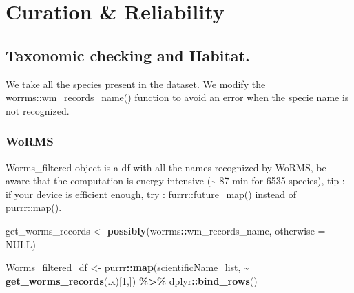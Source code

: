 \documentclass[
]{article}
\newenvironment{Shaded}{\begin{snugshade}}{\end{snugshade}}
\newcommand{\AttributeTok}[1]{\textcolor[rgb]{0.13,0.29,0.53}{#1}}
\newcommand{\ConstantTok}[1]{\textcolor[rgb]{0.56,0.35,0.01}{#1}}
\newcommand{\DecValTok}[1]{\textcolor[rgb]{0.00,0.00,0.81}{#1}}
\newcommand{\FunctionTok}[1]{\textcolor[rgb]{0.13,0.29,0.53}{\textbf{#1}}}
\newcommand{\NormalTok}[1]{#1}
\newcommand{\OtherTok}[1]{\textcolor[rgb]{0.56,0.35,0.01}{#1}}
\newcommand{\SpecialCharTok}[1]{\textcolor[rgb]{0.81,0.36,0.00}{\textbf{#1}}}
\begin{document}
\hypertarget{curation-reliability}{%
\section{Curation \& Reliability}\label{curation-reliability}}

\hypertarget{taxonomic-checking-and-habitat.}{%
\subsection{Taxonomic checking and
Habitat.}\label{taxonomic-checking-and-habitat.}}

We take all the species present in the dataset. We modify the
worrms::wm\_records\_name() function to avoid an error when the specie
name is not recognized.

\begin{Shaded}
\end{Shaded}

\hypertarget{worms}{%
\subsubsection{WoRMS}\label{worms}}

Worms\_filtered object is a df with all the names recognized by WoRMS,
be aware that the computation is energy-intensive (\textasciitilde{} 87
min for 6535 species), tip : if your device is efficient enough, try :
furrr::future\_map() instead of purrr::map().

\begin{Shaded}
\begin{Highlighting}[]
\NormalTok{get\_worms\_records }\OtherTok{\textless{}{-}} \FunctionTok{possibly}\NormalTok{(worrms}\SpecialCharTok{::}\NormalTok{wm\_records\_name, }\AttributeTok{otherwise =} \ConstantTok{NULL}\NormalTok{)}

\NormalTok{Worms\_filtered\_df }\OtherTok{\textless{}{-}}\NormalTok{ purrr}\SpecialCharTok{::}\FunctionTok{map}\NormalTok{(scientificName\_list, }\SpecialCharTok{\textasciitilde{}} \FunctionTok{get\_worms\_records}\NormalTok{(.x)[}\DecValTok{1}\NormalTok{,]) }\SpecialCharTok{\%\textgreater{}\%} 
\NormalTok{  dplyr}\SpecialCharTok{::}\FunctionTok{bind\_rows}\NormalTok{() }
\end{Highlighting}
\end{Shaded}
\end{document}
